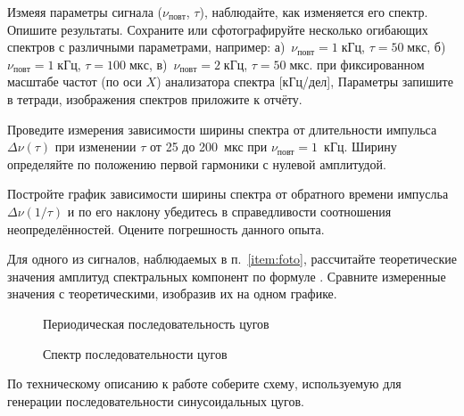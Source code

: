 \begin{lab:task}
\item\label{item:foto} Измеяя параметры сигнала ($\nu_{повт}$, $\tau$),
наблюдайте, как изменяется его спектр. Опишите результаты.
Сохраните или сфотографируйте несколько огибающих спектров с различными
параметрами, например:
а)~$\nu_{повт}=1\;кГц$, $\tau=50\;мкс$,
б)~$\nu_{повт}=1\;кГц$, $\tau=100\;мкс$,
в)~$\nu_{повт}=2\;кГц$, $\tau=50\;мкс$.
при фиксированном масштабе частот (по оси $X$) анализатора спектра [кГц/дел],
Параметры запишите в тетради, изображения спектров приложите к отчёту.

\item Проведите измерения зависимости ширины спектра от длительности
импульса~$\Delta \nu(\tau)$ при изменении $\tau$ от 25 до 200~мкс при
$\nu_\text{повт}=1$~кГц. Ширину определяйте по положению первой гармоники
с нулевой амплитудой.

\item Постройте график зависимости ширины спектра от обратного времени импусльа
$\Delta \nu(1/\tau)$ и по его наклону убедитесь в справедливости соотношения
неопределённостей. Оцените погрешность данного опыта.

\item Для одного из сигналов, наблюдаемых в п.~\ref{item:foto}, рассчитайте теоретические
значения амплитуд спектральных компонент по формуле .
Сравните измеренные значения с теоретическими, изобразив их на одном графике.



\begin{figure}[h!]
\hfil\hfil
\begin{minipage}[b]{0.45\textwidth}
    \caption{Периодическая последовательность цугов}
\end{minipage}
\hfil
\begin{minipage}[b]{0.45\textwidth}
\centering
    \caption{Спектр последовательности цугов}
\end{minipage}
\end{figure}


\item По техническому описанию к работе соберите схему, используемую
для генерации последовательности синусоидальных цугов.


\end{lab:task}
